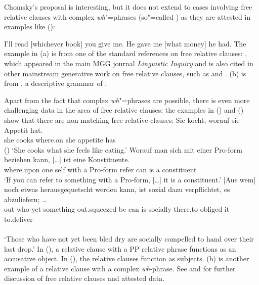 \documentclass[output=paper,biblatex,babelshorthands,newtxmath,draftmode,colorlinks,citecolor=brown]{langscibook}
\begin{document}
Chomsky's proposal is interesting, but it does not extend to cases involving free relative clauses
with complex \emph{wh}"=phrases (so"=called ) as they are attested in examples like
(): 

\eal
\ex I'll read [whichever book] you give me.
\ex He gave me [what money] he had.
\zl
The example in (a) is from one of the standard references on free relative clauses:
, which appeared in the main MGG journal \emph{Linguistic Inquiry}
and is also cited in other mainstream generative work on free relative clauses, such as
 and . (b) is from , a
descriptive grammar of . 

Apart from the fact that complex \emph{wh}"=phrases are possible, there is even more challenging data in the area of
free relative clauses: the examples in () and () show that there are non-matching free
relative clauses:
\ea
\gll Sie kocht, worauf   sie Appetit  hat.\footnotemark\\
     she cooks  where.on she appetite has\\\hfill()
\glt `She cooks what she feels like eating.'
\z
\eal
\ex
\gll Worauf man sich mit einer Pro-form beziehen kann, [\ldots]  ist eine Kon\-sti\-tu\-en\-te.\footnotemark\\
     where.upon one self with a Pro-form  refer   can  {}        is  a    constituent\\
\glt `If you can refer to something with a Pro-form, [\ldots] it is a constituent.'
\ex
\gll {}[Aus wem] noch etwas herausgequetscht werden kann, ist sozial dazu ver\-pflich\-tet, es
abzuliefern; \ldots\label{bsp-droste}\footnotemark\\
  \spacebr{}out who yet something out.squeezed be can is socially there.to obliged it to.deliver\\
\\
\glt `Those who have not yet been bled dry are socially compelled to hand over their last drop.'
\zl
In (), a relative clause with a PP relative phrase functions as an accusative object. In
(), the relative clauses function as subjects. (b) is another example of a relative
clause with a complex \emph{wh}-phrase. See \citet{Bausewein90} and \citet{Mueller99b} for further discussion of free relative
clauses and attested data.
\end{document}
